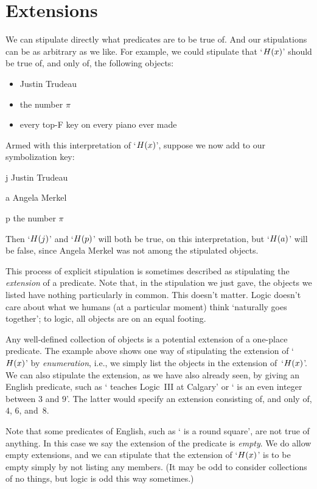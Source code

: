 \section{Extensions}\label{sec:extensions}
We can stipulate directly what predicates are to be true of. And our stipulations can be as arbitrary as we like. For example, we could stipulate that `$\mathord{H}(x)$' should be true of, and only of, the following objects:
	\begin{itemize}
		\item Justin Trudeau
		\item the number $\pi$
		\item every top-F key on every piano ever made
	\end{itemize}
Armed with this interpretation of `$\mathord{H}(x)$', suppose we now add to our symbolization key:
	\begin{ekey}
		\item[j] Justin Trudeau
		\item[a] Angela Merkel
		\item[p] the number $\pi$
	\end{ekey}
Then `$\mathord{H}(j)$' and `$\mathord{H}(p)$' will both be true, on this interpretation, but `$\mathord{H}(a)$' will be false, since Angela Merkel was not among the stipulated objects.

This process of explicit stipulation is sometimes described as stipulating the \emph{extension} of a predicate. Note that, in the stipulation we just gave, the objects we listed have nothing particularly in common. This doesn't matter. Logic doesn't care about what we humans (at a particular moment) think `naturally goes together'; to logic, all objects are on an equal footing.

Any well-defined collection of objects is a potential extension of a one-place predicate.  The example above shows one way of stipulating the extension of `$\mathord{H}(x)$' by \emph{enumeration}, i.e., we simply list the objects in the extension of~`$\mathord{H}(x)$'. We can also stipulate the extension, as we have also already seen, by giving an English predicate, such as ` teaches Logic~III at Calgary' or ` is an even integer between $3$ and $9$'. The latter would specify an extension consisting of, and only of, $4$, $6$, and~$8$.

Note that some predicates of English, such as ` is a round square', are not true of anything.  In this case we say the extension of the predicate is \emph{empty}.  We do allow empty extensions, and we can stipulate that the extension of `$\mathord{H}(x)$' is to be empty simply by not listing any members. (It may be odd to consider collections of no things, but logic is odd this way sometimes.)


